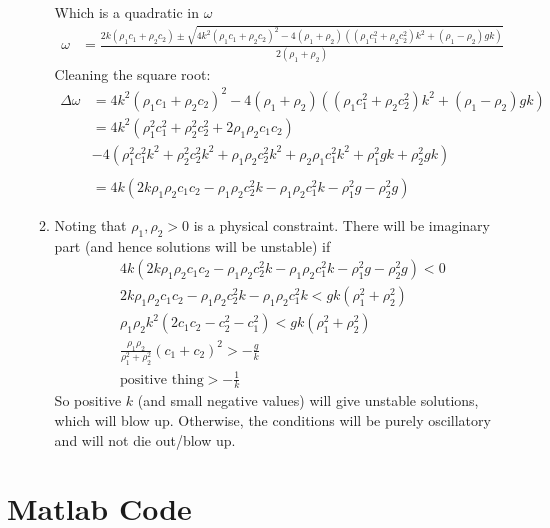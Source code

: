 \documentclass{/home/janmebows/Documents/LatexTemplates/myassignment}
\begin{document}
\begin{enumerate}
\begin{enumerate}
        Which is a quadratic in $\omega$
        \begin{align*}
            \omega &=\frac{2k(\rho_1c_1+\rho_2c_2) \pm \sqrt{4k^2(\rho_1c_1+\rho_2c_2)^2 -4(\rho_1+\rho_2)((\rho_1c_1^2+\rho_2c_2^2)k^2+(\rho_1-\rho_2)gk)}}{2(\rho_1+\rho_2)}
        \end{align*}
        Cleaning the square root:
        \begin{align*}
            \Delta \omega &= 4k^2(\rho_1c_1+\rho_2c_2)^2 -4(\rho_1+\rho_2)((\rho_1c_1^2+\rho_2c_2^2)k^2+(\rho_1-\rho_2)gk)\\
            &=4k^2(\rho_1^2c_1^2 + \rho_2^2c_2^2 + 2\rho_1\rho_2c_1c_2) \\&- 4(\rho_1^2c_1^2k^2 + \rho_2^2c_2^2k^2 + \rho_1\rho_2c_2^2k^2 + \rho_2\rho_1c_1^2k^2 + \rho_1^2gk + \rho_2^2gk )\\\\
            &=4k\left(2k\rho_1\rho_2c_1c_2 - \rho_1\rho_2c_2^2k -\rho_1\rho_2c_1^2k -\rho_1^2g -\rho_2^2g\right)
        \end{align*}
        \item %
        Noting that $\rho_1,\rho_2 > 0$ is a physical constraint.
        There will be imaginary part (and hence solutions will be unstable) if
        \begin{align*}
             4k\left(2k\rho_1\rho_2c_1c_2 - \rho_1\rho_2c_2^2k -\rho_1\rho_2c_1^2k -\rho_1^2g -\rho_2^2g\right) < 0\\
             2k\rho_1\rho_2c_1c_2 - \rho_1\rho_2c_2^2k -\rho_1\rho_2c_1^2k < gk(\rho_1^2 +\rho_2^2)\\
            \rho_1\rho_2k^2\left(2c_1c_2 - c_2^2 - c_1^2\right) < gk(\rho_1^2+\rho_2^2)\\
            \frac{\rho_1\rho_2}{\rho_1^2 + \rho_2^2}\left(c_1+c_2\right)^2 > -\frac gk \\
            \text{positive thing} > -\frac{1}{k}
         \end{align*} 
         So positive $k$ (and small negative values) will give unstable solutions, which will blow up. Otherwise, the conditions will be purely oscillatory and will not die out/blow up.

    \end{enumerate}
\end{enumerate}


\section*{Matlab Code}


\clearpage

\end{document}
